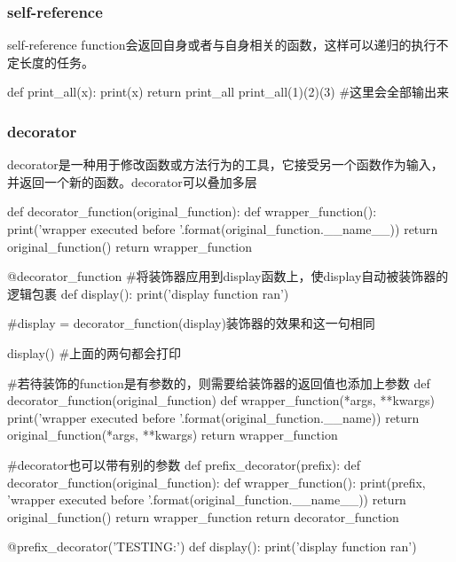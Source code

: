     \subsubsection{self-reference}
      self-reference function会返回自身或者与自身相关的函数，这样可以递归的执行不定长度的任务。
      \begin{codeblock}[language=python, caption={self-reference}]
      def print_all(x):
        print(x)
        return print_all
      print_all(1)(2)(3) #这里会全部输出来
      \end{codeblock}

    \subsubsection{decorator}
      \label{subsubsec:decorator}
      decorator是一种用于修改函数或方法行为的工具，它接受另一个函数作为输入，并返回一个新的函数。decorator可以叠加多层
      \begin{codeblock}[language=python, caption={decorator}]
        def decorator_function(original_function):
            def wrapper_function():
                print('wrapper executed before {}'.format(original_function.__name__))
                return original_function()
            return wrapper_function

        @decorator_function #将装饰器应用到display函数上，使display自动被装饰器的逻辑包裹
        def display():
            print('display function ran')

        #display = decorator\_function(display)装饰器的效果和这一句相同

        display() #上面的两句都会打印
        
        #若待装饰的function是有参数的，则需要给装饰器的返回值也添加上参数
        def decorator_function(original_function)
            def wrapper_function(*args, **kwargs)
                print('wrapper executed before {}'.format(original_function.__name))
                return original_function(*args, **kwargs)
            return wrapper_function

        #decorator也可以带有别的参数
        def prefix_decorator(prefix):
          def decorator_function(original_function):
              def wrapper_function():
                  print(prefix, 
                      'wrapper executed before {}'.format(original_function.__name__))
                  return original_function()
              return wrapper_function
          return decorator_function

        @prefix_decorator('TESTING:')
        def display():
            print('display function ran')
      \end{codeblock}

